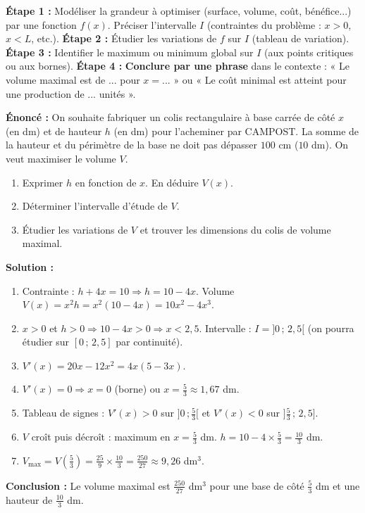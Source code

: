 \documentclass[11pt]{article}
\begin{document}
\begin{methode}
\textbf{Étape 1 :} Modéliser la grandeur à optimiser (surface, volume, coût, bénéfice...) par une fonction $f(x)$. Préciser l'intervalle $I$ (contraintes du problème : $x>0$, $x<L$, etc.).
\textbf{Étape 2 :} Étudier les variations de $f$ sur $I$ (tableau de variation).
\textbf{Étape 3 :} Identifier le maximum ou minimum global sur $I$ (aux points critiques ou aux bornes).
\textbf{Étape 4 :} \textbf{Conclure par une phrase} dans le contexte : « Le volume maximal est de ... pour $x = ...$ » ou « Le coût minimal est atteint pour une production de ... unités ».
\end{methode}

\begin{exemplebox}
\textbf{Énoncé :} On souhaite fabriquer un colis rectangulaire à base carrée de côté $x$ (en dm) et de hauteur $h$ (en dm) pour l'acheminer par CAMPOST. La somme de la hauteur et du périmètre de la base ne doit pas dépasser $100$ cm ($10$ dm). On veut maximiser le volume $V$.
\begin{enumerate}
  \item Exprimer $h$ en fonction de $x$. En déduire $V(x)$.
  \item Déterminer l'intervalle d'étude de $V$.
  \item Étudier les variations de $V$ et trouver les dimensions du colis de volume maximal.
\end{enumerate}
\textbf{Solution :}
\begin{enumerate}
  \item Contrainte : $h + 4x = 10 \Rightarrow h = 10 - 4x$. Volume $V(x) = x^2 h = x^2(10-4x) = 10x^2 - 4x^3$.
  \item $x > 0$ et $h > 0 \Rightarrow 10-4x > 0 \Rightarrow x < 2,5$. Intervalle : $I = ]0\,;\,2,5[$ (on pourra étudier sur $[0\,;\,2,5]$ par continuité).
  \item $V'(x) = 20x - 12x^2 = 4x(5 - 3x)$.
  \item $V'(x)=0 \Rightarrow x=0$ (borne) ou $x = \frac{5}{3} \approx 1,67$ dm.
  \item Tableau de signes : $V'(x) > 0$ sur $]0\,;\frac{5}{3}[$ et $V'(x) < 0$ sur $]\frac{5}{3}\,;\,2,5]$.
  \item $V$ croît puis décroît : maximum en $x = \frac{5}{3}$ dm. $h = 10 - 4\times\frac{5}{3} = \frac{10}{3}$ dm.
  \item $V_{\text{max}} = V(\frac{5}{3}) = \frac{25}{9} \times \frac{10}{3} = \frac{250}{27} \approx 9,26$ dm$^3$.
\end{enumerate}
\textbf{Conclusion :} Le volume maximal est $\frac{250}{27}$ dm$^3$ pour une base de côté $\frac{5}{3}$ dm et une hauteur de $\frac{10}{3}$ dm.
\end{exemplebox}
\end{document}
